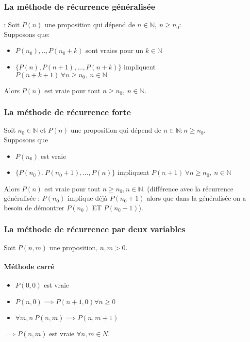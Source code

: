 \documentclass{article}
\begin{document}
\subsubsection{La méthode de récurrence généralisée} : Soit $ P(n) $ une proposition qui dépend de $ n \in \mathbb{N},\ n \geq n_0 $:\\
Supposons que:
\begin{itemize}
    \item $ P(n_0), .., P({n_0}+k) $ sont vraies pour un $ k \in \mathbb{N} $
    \item $ \{ P(n), P(n+1), ..., P(n+k) \} $ impliquent $ P(n+k+1)\ \forall n \geq n_0,\ n \in \mathbb{N} $
\end{itemize}
Alors $ P(n) $ est vraie pour tout $ n \geq n_0,\ n \in \mathbb{N} $.

\subsubsection{La méthode de récurrence forte} Soit $ n_0 \in \mathbb{N} $ et $ P(n) $ une proposition qui dépend de $ n \in \mathbb{N} : n \geq n_0 $.\\
Supposons que 
\begin{itemize}
    \item $ P(n_0) $ est vraie
    \item $ \{ P(n_0), P(n_0+1), ..., P(n) \} $ impliquent $ P(n+1)\ \forall n \geq n_0,\ n \in \mathbb{N} $
\end{itemize}
Alors $ P(n) $ est vraie pour tout $ n \geq n_0, n \in \mathbb{N} $.
(différence avec la récurrence généralisée : $ P(n_0) $ implique déjà $ P(n_0+1) $ alors que dans la généralisée on a besoin de démontrer $ P(n_0) $ ET $ P(n_0+1) $).

\subsubsection{La méthode de récurrence par deux variables}

Soit $ P(n, m) $ une proposition, $ n, m > 0 $.

\paragraph{Méthode carré}

\begin{itemize}
    \item $ P(0, 0) $ est vraie
    \item $ P(n, 0) \implies P(n + 1, 0) \forall n \geq 0 $ 
    \item $ \forall m, n\ P(n, m) \implies P(n, m + 1)$
\end{itemize}
$ \implies P(n, m) $ est vraie $ \forall n, m \in N $.
\end{document}
